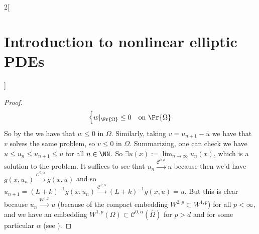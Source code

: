 \documentclass[../../../main_math.tex]{subfiles}
\begin{document}
\begin{multicols}{2}[\section{Introduction to nonlinear elliptic PDEs}]
\begin{proof}
$$\begin{cases}
        w|_{\Fr{\Omega}}\leq 0 & \text{on }\Fr{\Omega}
      \end{cases}
    $$
    So by the  we have that $w\leq 0$ in $\Omega$. Similarly, taking $v=u_{n+1}-\overline{u}$ we have that $v$ solves the same problem, so $v\leq 0$ in $\Omega$. Summarizing, one can check we have $\underline{u}\leq u_n\leq u_{n+1}\leq \overline{u}$ for all $n\in\NN$. So $\displaystyle\exists u(x):=\lim_{n\to\infty}u_n(x)$, which is a solution to the problem. It suffices to see that $u_n\overset{\mathcal{C}^{0,\alpha}}{\longrightarrow} u$ because then we'd have $g(x,u_n) \overset{\mathcal{C}^{0,\alpha}}{\longrightarrow} g(x,u)$ and so $u_{n+1}= (L+k)^{-1}g(x,u_n) \overset{\mathcal{C}^{2,\alpha}}{\longrightarrow} (L+k)^{-1}g(x,u)=u$. But this is clear because $u_n\overset{W^{1,p}}{\longrightarrow} u$ (because of the compact embedding $W^{2,p}\subset W^{1,p}$) for all $p<\infty$, and we have an embedding $W^{1,p}(\Omega)\subset \mathcal{C}^{0,\alpha}(\overline{\Omega})$ for $p>d$ and for some particular $\alpha$ (see ).
  \end{proof}

\end{multicols}
\end{document}
